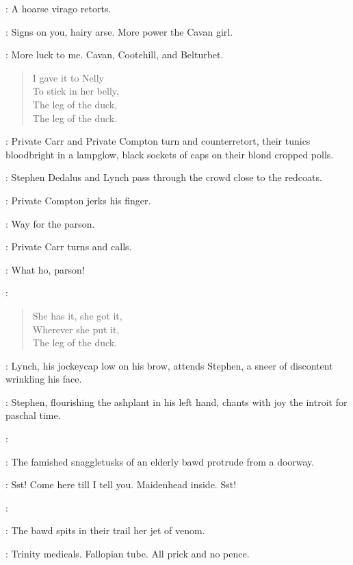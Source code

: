 :
A hoarse virago retorts.

\Virago:
Signs on you,
hairy arse.
More power the Cavan girl.

\Cissy:
More luck to me.
Cavan,
Cootehill,
and Belturbet.

\begin{verse}
    I gave it to Nelly\\
    To stick in her belly,\\
    The leg of the duck,\\
    The leg of the duck.
\end{verse}

:
Private Carr and Private Compton turn and counterretort,
their tunics bloodbright in a lampglow,
black sockets of caps on their blond cropped polls.

:
Stephen Dedalus and Lynch pass through the crowd close to the redcoats.

:
Private Compton jerks his finger.

\Compton:
Way for the parson.

:
Private Carr turns and calls.

\Carr:
What ho,
parson!

\Cissy:

\begin{verse}
%
    She has it,
she got it,\\
    Wherever she put it,\\
    The leg of the duck.
\end{verse}

:
Lynch,
his jockeycap low on his brow,
attends Stephen,
a sneer of discontent wrinkling his face.

:
Stephen,
flourishing the ashplant in his left hand,
chants with joy the introit for paschal time.

\Stephen:

:
The famished snaggletusks of an elderly bawd protrude from a doorway.

\Bawd:
Sst!
Come here till I tell you.
Maidenhead inside.
Sst!

\Stephen:

:
The bawd spits in their trail her jet of venom.

\Bawd:
Trinity medicals.
Fallopian tube.
All prick and no pence.

